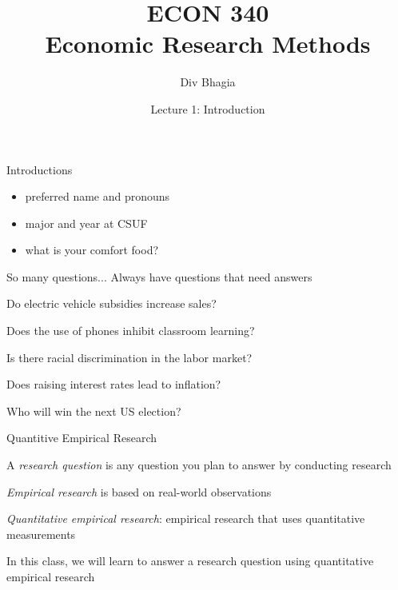 \documentclass{./../div_teaching_slides}
\begin{document}
\title{ECON 340 \\ Economic Research Methods}
\author{Div Bhagia}
\date{Lecture 1: Introduction}

\begin{frame}
\maketitle
\end{frame}

\begin{frame}{Introductions}
\begin{itemize}
\item preferred name and pronouns
\item major and year at CSUF 
\item what is your comfort food?
\end{itemize}
\end{frame}


\begin{frame}{So many questions...}
Always have questions that need answers \\
\begin{witemize}
\item Do electric vehicle subsidies increase sales? 
\item Does the use of phones inhibit classroom learning?
\item Is there racial discrimination in the labor market?
\item Does raising interest rates lead to inflation?
\item Who will win the next US election? 
\end{witemize}
\vspace{0.75em}
\end{frame}

\begin{frame}{Quantitive Empirical Research}
\begin{witemize}
  \item A \textit{research question} is any question you plan to answer by conducting research
  \item \textit{Empirical research} is based on real-world observations
  \item \textit{Quantitative empirical research}: empirical research that uses quantitative measurements
  \item In this class, we will learn to answer a research question using quantitative empirical research 
\end{witemize}
\end{frame}
\end{document}
